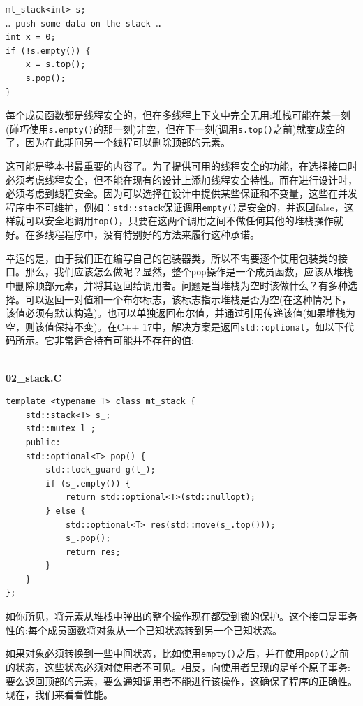 \begin{lstlisting}[style=styleCXX]
mt_stack<int> s;
… push some data on the stack …
int x = 0;
if (!s.empty()) {
	x = s.top();
	s.pop();
}
\end{lstlisting}

每个成员函数都是线程安全的，但在多线程上下文中完全无用:堆栈可能在某一刻(碰巧使用\texttt{s.empty()}的那一刻)非空，但在下一刻(调用\texttt{s.top()}之前)就变成空的了，因为在此期间另一个线程可以删除顶部的元素。

这可能是整本书最重要的内容了。为了提供可用的线程安全的功能，在选择接口时必须考虑线程安全，但不能在现有的设计上添加线程安全特性。而在进行设计时，必须考虑到线程安全。因为可以选择在设计中提供某些保证和不变量，这些在并发程序中不可维护，例如：\texttt{std::stack}保证调用\texttt{empty()}是安全的，并返回false，这样就可以安全地调用\texttt{top()}，只要在这两个调用之间不做任何其他的堆栈操作就好。在多线程程序中，没有特别好的方法来履行这种承诺。

幸运的是，由于我们正在编写自己的包装器类，所以不需要逐个使用包装类的接口。那么，我们应该怎么做呢？显然，整个\texttt{pop}操作是一个成员函数，应该从堆栈中删除顶部元素，并将其返回给调用者。问题是当堆栈为空时该做什么？有多种选择。可以返回一对值和一个布尔标志，该标志指示堆栈是否为空(在这种情况下，该值必须有默认构造)。也可以单独返回布尔值，并通过引用传递该值(如果堆栈为空，则该值保持不变)。在C++ 17中，解决方案是返回\texttt{std::optional}，如以下代码所示。它非常适合持有可能并不存在的值:

\hspace*{\fill} \\ %
\noindent
\textbf{02\_stack.C}
\begin{lstlisting}[style=styleCXX]
template <typename T> class mt_stack {
	std::stack<T> s_;
	std::mutex l_;
	public:
	std::optional<T> pop() {
		std::lock_guard g(l_);
		if (s_.empty()) {
			return std::optional<T>(std::nullopt);
		} else {
			std::optional<T> res(std::move(s_.top()));
			s_.pop();
			return res;
		}
	}
};
\end{lstlisting}

如你所见，将元素从堆栈中弹出的整个操作现在都受到锁的保护。这个接口是事务性的:每个成员函数将对象从一个已知状态转到另一个已知状态。

如果对象必须转换到一些中间状态，比如使用\texttt{empty()}之后，并在使用\texttt{pop()}之前的状态，这些状态必须对使用者不可见。相反，向使用者呈现的是单个原子事务:要么返回顶部的元素，要么通知调用者不能进行该操作，这确保了程序的正确性。现在，我们来看看性能。


